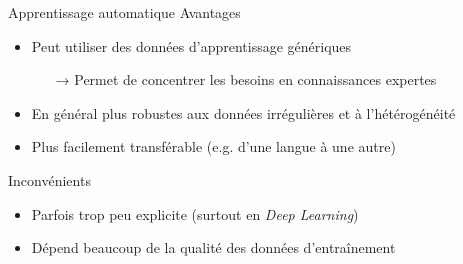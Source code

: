 \documentclass[hyperref={unicode}, xcolor={svgnames}, french]{beamer}
\begin{document}
\begin{frame}{Apprentissage automatique}
    Avantages
    \begin{itemize}
        \item Peut utiliser des données d'apprentissage génériques
            \begin{itemize}
                \item[→] Permet de concentrer les besoins en connaissances expertes
            \end{itemize}
        \item En général plus robustes aux données irrégulières et à l'hétérogénéité
        \item Plus facilement transférable (e.g. d'une langue à une autre)
    \end{itemize}
    Inconvénients
    \begin{itemize}
        \item Parfois trop peu explicite (surtout en \textit{Deep Learning})
        \item Dépend beaucoup de la qualité des données d'entraînement
    \end{itemize}
\end{frame}
\end{document}
